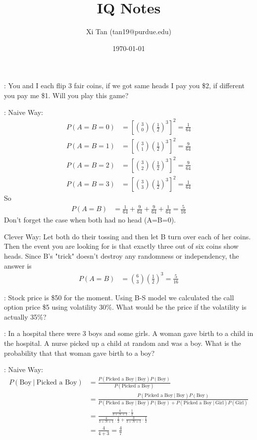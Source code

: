 \documentclass{article}
\title{IQ Notes}
\author{Xi Tan (tan19@purdue.edu)}
\date{\today}
\begin{document}
\maketitle

\Q: You and I each flip 3 fair coins, if we got same heads I pay you \$2, if different you pay me \$1. Will you play this game?

\A: Naive Way: 
\begin{align}
	P(A=B=0) &= \left[{{3}\choose{0}} \left(\frac{1}{2}\right)^3\right]^2 = \frac{1}{64}\\
	P(A=B=1) &= \left[{{3}\choose{1}} \left(\frac{1}{2}\right)^3\right]^2 = \frac{9}{64}\\
	P(A=B=2) &= \left[{{3}\choose{2}} \left(\frac{1}{2}\right)^3\right]^2 = \frac{9}{64}\\
	P(A=B=3) &= \left[{{3}\choose{3}} \left(\frac{1}{2}\right)^3\right]^2 = \frac{1}{64}	
\end{align}
So
\begin{align}
	P(A=B) &= \frac{1}{64} + \frac{9}{64} + \frac{9}{64} + \frac{1}{64} = \frac{5}{16}
\end{align}
Don't forget the case when both had no head (A=B=0).

Clever Way: Let both do their tossing and then let B turn over each of her coins. Then the event you are looking for is that exactly three out of six coins show heads. Since B's "trick" doesn't destroy any randomness or independency, the answer is
\begin{align}
	P(A=B) &= {{6}\choose{3}} \left(\frac{1}{2}\right)^3 = \frac{5}{16}
\end{align}

\Q: Stock price is \$50 for the moment. Using B-S model we calculated the call option price \$5 using volatility 30\%. What would be the price if the volatility is actually 35\%?

\Q: In a hospital there were 3 boys and some girls. A woman gave birth to a child in the hospital. A nurse picked up a child at random and was a boy. What is the probability that that woman gave birth to a boy?

\A: Naive Way:
\begin{align}
	P(\text{Boy} ~|~ \text{Picked a Boy}) &= \frac{P(\text{Picked a Boy} ~|~ \text{Boy})P(\text{Boy})}{P(\text{Picked a Boy})}\\
	 &= \frac{P(\text{Picked a Boy} ~|~ \text{Boy})P(\text{Boy})}{P(\text{Picked a Boy} ~|~ \text{Boy})P(\text{Boy}) + P(\text{Picked a Boy} ~|~ \text{Girl})P(\text{Girl})}\\
	 &= \frac{\frac{4}{3+N+1} \cdot \frac{1}{2}}{\frac{4}{3+N+1} \cdot \frac{1}{2} + \frac{3}{3+N+1} \cdot \frac{1}{2}}\\
	 &= \frac{4}{4+3} = \frac{4}{7}
\end{align}
\end{document}
